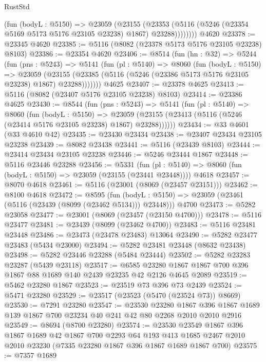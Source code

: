 \begin{lexlean}{RustStd}
\begin{coremodule}
            (fun (bodyL : @5150) =>
            @23059
              (@23155
                (@23353 (@5116 (@5246 (@23354 @5169 @5173 @5176 @23105 @23238) @1867) @23288))))))))
    @4620
@23378 := @23345 @4620
@23385 := @5116 (@8082 (@23378 @5173 @5176 @23105 @23238) @8103)
@23386 := @23354 @4620
@23406 := @8514
    (fun (hn : @32) =>
    @5244
      (fun (pns : @5243) =>
      @5141
        (fun (pl : @5140) =>
        @8060
          (fun (bodyL : @5150) =>
          @23059
            (@23155 (@23385 (@5116 (@5246 (@23386 @5173 @5176 @23105 @23238) @1867) @23288)))))))
    @4625
@23407 := @23378 @4625
@23413 := @5116 (@8082 (@23407 @5176 @23105 @23238) @8103)
@23414 := @23386 @4625
@23430 := @8544
    (fun (pns : @5243) =>
    @5141
      (fun (pl : @5140) =>
      @8060
        (fun (bodyL : @5150) =>
        @23059 (@23155 (@23413 (@5116 (@5246 (@23414 @5176 @23105 @23238) @1867) @23288))))))
@23434 := @33 @4601 (@33 @4610 @42)
@23435 := @23430 @23434
@23438 := @23407 @23434 @23105 @23238
@23439 := @8082 @23438
@23441 := @5116 (@23439 @8103)
@23444 := @23414 @23434 @23105 @23238
@23446 := @5246 @23444 @1867
@23448 := @5116 @23446 @23288
@23456 := @5331
    (fun (pl : @5140) => @8060 (fun (bodyL : @5150) => @23059 (@23155 (@23441 @23448))))
    @4618
@23457 := @8070 @4618
@23461 := @5116 (@23001 (@8069 (@23457 @23151)))
@23462 := @8100 @4618
@23472 := @8595
    (fun (bodyL : @5150) => @23059 (@23461 (@5116 (@23439 (@8099 (@23462 @5134))) @23448)))
    @4700
@23473 := @5282 @23058
@23477 := @23001 (@8069 (@23457 (@23150 @4700)))
@23478 := @5116 @23477
@23481 := @23439 (@8099 (@23462 @4700))
@23483 := @5116 @23481 @23448
@23486 := @23473 (@23478 @23483) @13064
@23490 := @5282 @23477 @23483 (@5434 @23000)
@23494 := @5282 @23481 @23448 (@8632 @23438)
@23498 := @5282 @23446 @23288 (@5484 @23444)
@23502 := @5282 @23283 @23287 (@5439 @23118)
@23517 := @6585 @23280 @1867 @1867 @700 @396 @1867 @88 @1689 @140 @2439 @23235 @42 @2126 @4645 @2089
@23519 := @5462 @23280 @1867
@23523 := @23519 @73 @396 @73 @2439
@23524 := @5471 @23280
@23529 := @23517 (@23523 (@5470 (@23524 @73)) @8669)
@23530 := @7291 @23280
@23547 := @23530
    @23280
    @1867
    @396
    @1867
    @1689
    @139
    @1867
    @700
    @23234
    @40
    @241
    @42
    @80
    @2268
    @2010
    @2010
    @2916
@23549 := @8694 (@8700 @23280)
@23574 := @23530
    @23549
    @1867
    @396
    @1867
    @1689
    @42
    @1867
    @700
    @2293
    @64
    @193
    @413
    @1685
    @2467
    @2010
    @2010
    @23230
    (@7335 @23280 @1867 @396 @1867 @1689 @1867 @700)
@23575 := @7357 @1689

\end{coremodule}
\end{lexlean}
